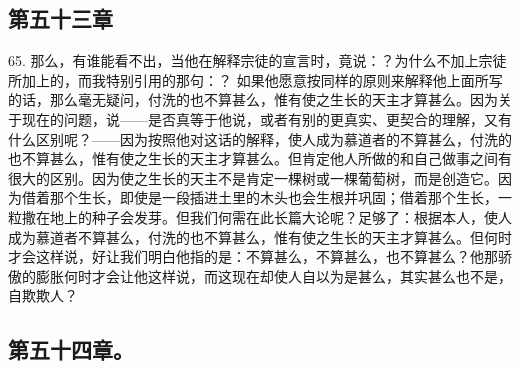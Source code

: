 
\subsection{第五十三章}

65. 那么，有谁能看不出，当他在解释宗徒的宣言时，竟说：？为什么不加上宗徒所加上的，而我特别引用的那句：？ 如果他愿意按同样的原则来解释他上面所写的话，那么毫无疑问，付洗的也不算甚么，惟有使之生长的天主才算甚么。因为关于现在的问题，说——是否真等于他说，或者有别的更真实、更契合的理解，又有什么区别呢？——因为按照他对这话的解释，使人成为慕道者的不算甚么，付洗的也不算甚么，惟有使之生长的天主才算甚么。但肯定他人所做的和自己做事之间有很大的区别。因为使之生长的天主不是肯定一棵树或一棵葡萄树，而是创造它。因为借着那个生长，即使是一段插进土里的木头也会生根并巩固；借着那个生长，一粒撒在地上的种子会发芽。但我们何需在此长篇大论呢？足够了：根据本人，使人成为慕道者不算甚么，付洗的也不算甚么，惟有使之生长的天主才算甚么。但何时才会这样说，好让我们明白他指的是：不算甚么，不算甚么，也不算甚么？他那骄傲的膨胀何时才会让他这样说，而这现在却使人自以为是甚么，其实甚么也不是，自欺欺人？\par


\subsection{第五十四章。}

